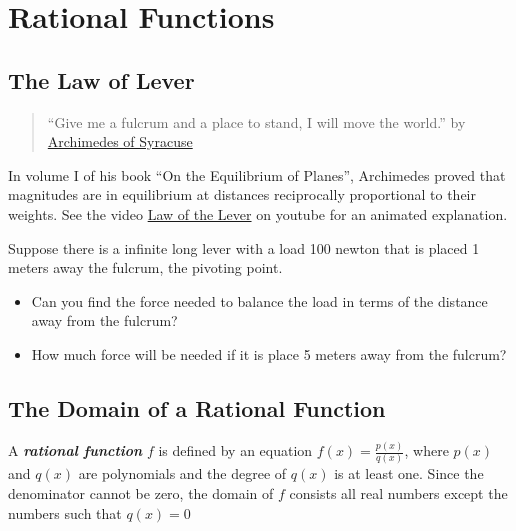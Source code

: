 \documentclass[
  en,11pt]{elegantbook}
\providecommand{\tightlist}{%
  \setlength{\itemsep}{0pt}\setlength{\parskip}{0pt}}
\newcommand{\size}[2]{{\fontsize{#1}{0}\selectfont#2}}
\newenvironment{rmdthink}{
	\vspace*{0.5\baselineskip}
	\par\noindent
	\makebox[-4pt][r]{\color{green!90}\size{12}{\faLightbulbO}\,\,}
    \begin{tcolorbox}[
    enhanced,
    title={\textbf{\color{second}Think}},
    title style={left color=blue!10!green!20!white,right color=yellow!20!blue!20!white},
    colback=green!20!white,
    ]
    \sffamily
}{
    \end{tcolorbox}
	\par\ignorespacesafterend
}
\begin{document}
\hypertarget{rational-functions}{%
\chapter{Rational Functions}\label{rational-functions}}

\hypertarget{the-law-of-lever}{%
\section{The Law of Lever}\label{the-law-of-lever}}

\begin{rmdthink}

\begin{quote}
``Give me a fulcrum and a place to stand, I will move the world.'' by \href{https://en.wikipedia.org/wiki/Archimedes\#Mathematics}{Archimedes of Syracuse}
\end{quote}

In volume I of his book ``On the Equilibrium of Planes'', Archimedes proved that magnitudes are in equilibrium at distances reciprocally proportional to their weights. See the video \href{https://youtu.be/yhrR4384SGE?t=8}{Law of the Lever} on youtube for an animated explanation.

Suppose there is a infinite long lever with a load 100 newton that is placed 1 meters away the fulcrum, the pivoting point.

\begin{itemize}
\tightlist
\item
  Can you find the force needed to balance the load in terms of the distance away from the fulcrum?
\item
  How much force will be needed if it is place 5 meters away from the fulcrum?
\end{itemize}

\end{rmdthink}

\hypertarget{the-domain-of-a-rational-function}{%
\section{The Domain of a Rational Function}\label{the-domain-of-a-rational-function}}

A \textbf{\emph{rational function}} \(f\) is defined by an equation \(f(x)=\frac{p(x)}{q(x)}\), where \(p(x)\) and \(q(x)\) are polynomials and the degree of \(q(x)\) is at least one. Since the denominator cannot be zero, the domain of \(f\) consists all real numbers except the numbers such that \(q(x)=0\)
\end{document}
